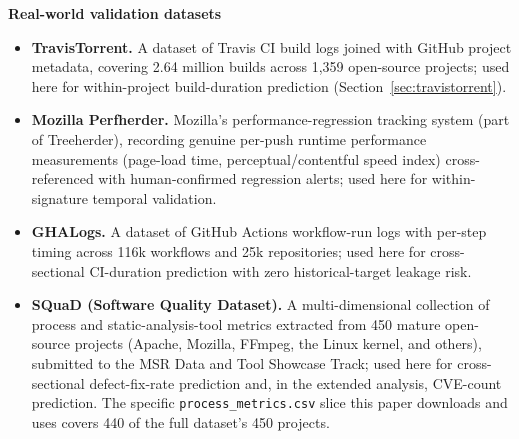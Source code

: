 \documentclass[technologies,article,submit,pdftex,moreauthors]{Definitions/mdpi}
\begin{document}
{\vspace{6pt}\noindent\textbf{Real-world validation datasets}
\begin{itemize}
\setlength{\itemsep}{2pt}
\item \textbf{TravisTorrent.} A dataset of Travis CI build logs joined with GitHub project metadata, covering 2.64 million builds across 1,359 open-source projects; used here for within-project build-duration prediction (Section~\ref{sec:travistorrent}).
\item \textbf{Mozilla Perfherder.} Mozilla's performance-regression tracking system (part of Treeherder), recording genuine per-push runtime performance measurements (page-load time, perceptual/contentful speed index) cross-referenced with human-confirmed regression alerts; used here for within-signature temporal validation.
\item \textbf{GHALogs.} A dataset of GitHub Actions workflow-run logs with per-step timing across 116k workflows and 25k repositories; used here for cross-sectional CI-duration prediction with zero historical-target leakage risk.
\item \textbf{SQuaD (Software Quality Dataset).} A multi-dimensional collection of process and static-analysis-tool metrics extracted from 450 mature open-source projects (Apache, Mozilla, FFmpeg, the Linux kernel, and others), submitted to the MSR Data and Tool Showcase Track; used here for cross-sectional defect-fix-rate prediction and, in the extended analysis, CVE-count prediction. The specific \texttt{process\_metrics.csv} slice this paper downloads and uses covers 440 of the full dataset's 450 projects.
\end{itemize}
}
\end{document}
